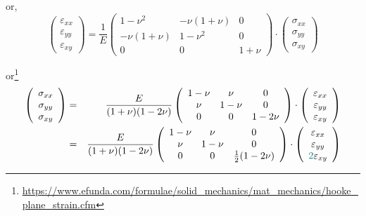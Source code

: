 or,
\begin{equation}
\left(
\begin{array}{c}
\varepsilon_{xx}\\
\varepsilon_{yy}\\
\varepsilon_{xy}
\end{array}
\right)
=\frac1E
\left(
\begin{array}{ccc}
1-\nu^2 & -\nu(1+\nu) & 0 \\
-\nu(1+\nu) & 1-\nu^2 & 0 \\
0 & 0 & 1+\nu
\end{array}
\right)
\cdot
\left(
\begin{array}{c}
\sigma_{xx}\\
\sigma_{yy}\\
\sigma_{xy}
\end{array}
\right)
\end{equation}


or\footnote{\url{https://www.efunda.com/formulae/solid_mechanics/mat_mechanics/hooke_plane_strain.cfm}}
\begin{eqnarray}
\left(
\begin{array}{c}
\sigma_{xx}\\
\sigma_{yy}\\
\sigma_{xy}
\end{array}
\right)
&=&\frac{E}{(1+\nu)(1-2\nu)}
\left(
\begin{array}{ccc}
1-\nu & \nu & 0  \\
\nu & 1-\nu & 0 \\
0 & 0 & 1-2\nu
\end{array}
\right)
\cdot
\left(
\begin{array}{c}
\varepsilon_{xx}\\
\varepsilon_{yy}\\
\varepsilon_{xy}
\end{array}
\right) \nonumber\\
&=&\frac{E}{(1+\nu)(1-2\nu)}
\left(
\begin{array}{ccc}
1-\nu & \nu & 0  \\
\nu & 1-\nu & 0 \\
0 & 0 & \frac12(1-2\nu)
\end{array}
\right)
\cdot
\left(
\begin{array}{c}
\varepsilon_{xx}\\
\varepsilon_{yy}\\
{\color{teal}2}\varepsilon_{xy}
\end{array}
\right) 
\end{eqnarray}

